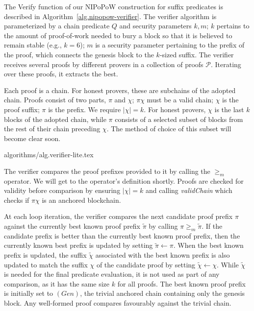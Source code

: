 The \textsf{Verify} function of our NIPoPoW construction  for suffix predicates
is described in
Algorithm~\ref{alg.nipopow-verifier}. The verifier algorithm is parameterized by
a chain predicate $Q$ and security parameters $k, m$; $k$
pertains to the amount of proof-of-work needed to bury a block so that it is
believed to remain stable (e.g., $k = 6$); $m$ is a security
parameter pertaining to the prefix of the proof, which connects the genesis
block to the $k$-sized suffix. The verifier receives several proofs by
different provers in a collection of proofs $\mathcal{P}$. Iterating over these
proofs, it extracts the best.

Each proof is a chain. For honest provers, these are subchains of the  adopted
chain. Proofs consist of two parts, $\pi$ and $\chi$; $\pi \chi$ must be a valid
chain; $\chi$ is the proof suffix; $\pi$ is the prefix. We require $|\chi| = k$.
For honest provers, $\chi$ is the last $k$ blocks of the adopted chain, while
$\pi$ consists of a selected subset of blocks from the rest of their chain
preceding $\chi$. The method of choice of this subset will become clear soon.

{algorithms/alg.verifier-lite.tex}

The verifier compares the proof prefixes provided to it by calling the $\geq_m$
operator. We will get to the operator's definition shortly. Proofs are checked
for validity before comparison by ensuring $|\chi| = k$ and calling
\textit{validChain} which checks if $\pi\chi$ is an anchored blockchain.

At each loop iteration, the verifier compares the next candidate proof prefix
$\pi$ against the currently best known proof prefix $\tilde\pi$ by calling $\pi
\geq_m \tilde\pi$. If the candidate prefix is better than the currently best
known proof prefix, then the currently known best prefix is updated by setting
$\tilde\pi \leftarrow \pi$. When the best known prefix is updated, the suffix
$\tilde\chi$ associated with the best known prefix is also updated to match the
suffix $\chi$ of the candidate proof by setting $\tilde\chi \leftarrow \chi$.
While $\tilde\chi$ is needed for the final predicate evaluation, it is not used
as part of any comparison, as it has the same size $k$ for all proofs. The best
known proof prefix is initially set to $(Gen)$, the trivial anchored chain
containing only the genesis block. Any well-formed proof compares favourably
against the trivial chain.

